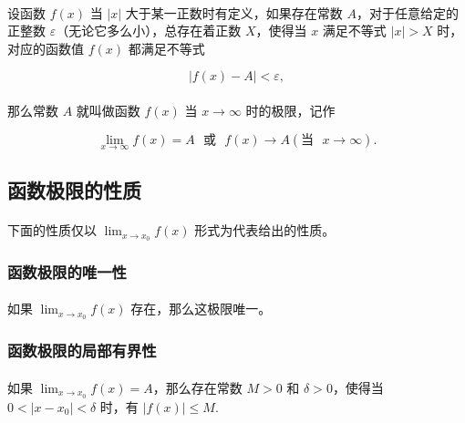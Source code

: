 \paragraph{}
设函数 $f(x)$ 当 $|x|$ 大于某一正数时有定义，如果存在常数 $A$，对于任意给定的正整数 $\varepsilon$（无论它多么小），总存在着正数 $X$，使得当 $x$ 满足不等式 $|x| > X$ 时，对应的函数值 $f(x)$ 都满足不等式

\begin{equation}
|f(x) - A| < \varepsilon,
\end{equation}

\paragraph{}
那么常数 $A$ 就叫做函数 $f(x)$ 当 $x \to \infty$ 时的极限，记作

\begin{equation}
\lim_{x \to \infty} f(x) = A \text{~~或~~} f(x) \to A (\text{当~~} x \to \infty).
\end{equation}

\subsection{函数极限的性质}
\paragraph{}
下面的性质仅以 $\displaystyle{\lim_{x \to x_0}}f(x)$ 形式为代表给出的性质。

\subsubsection{函数极限的唯一性}
\paragraph{}
如果 $\displaystyle{\lim_{x \to x_0}}f(x)$ 存在，那么这极限唯一。

\subsubsection{函数极限的局部有界性}
\paragraph{}
如果 $\displaystyle{\lim_{x \to x_0}}f(x) = A$，那么存在常数 $M > 0$ 和 $\delta > 0$，使得当 $0 < |x - x_0| < \delta$ 时，有 $|f(x)| \leq M$.

